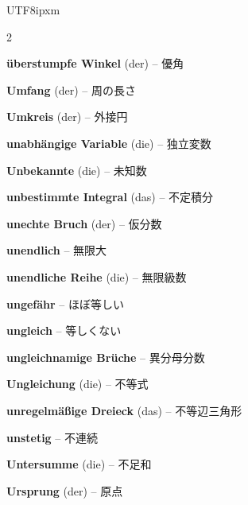 \begin{CJK}{UTF8}{ipxm}
\begin{multicols}{2}
\par\nopagebreak
\textbf{überstumpfe Winkel} (der) -- 優角\dotfill\hyperref[e:161]{\pageref*{e:161}}\par
\textbf{Umfang} (der) -- 周の長さ\dotfill\hyperref[e:209]{\pageref*{e:209}}\par
\textbf{Umkreis} (der) -- 外接円\dotfill\hyperref[e:194]{\pageref*{e:194}}\par
\textbf{unabhängige Variable} (die) -- 独立変数\dotfill\hyperref[e:106]{\pageref*{e:106}}\par
\textbf{Unbekannte} (die) -- 未知数\dotfill\hyperref[e:73]{\pageref*{e:73}}\par
\textbf{unbestimmte Integral} (das) -- 不定積分\dotfill\hyperref[e:287]{\pageref*{e:287}}\par
\textbf{unechte Bruch} (der) -- 仮分数\dotfill\hyperref[e:32]{\pageref*{e:32}}\par
\textbf{unendlich} -- 無限大\dotfill\hyperref[e:70]{\pageref*{e:70}}\par
\textbf{unendliche Reihe} (die) -- 無限級数\dotfill\hyperref[e:266]{\pageref*{e:266}}\par
\textbf{ungefähr} -- ほぼ等しい\dotfill\hyperref[e:69]{\pageref*{e:69}}\par
\textbf{ungleich} -- 等しくない\dotfill\hyperref[e:61]{\pageref*{e:61}}\par
\textbf{ungleichnamige Brüche} -- 異分母分数\dotfill\hyperref[e:35]{\pageref*{e:35}}\par
\textbf{Ungleichung} (die) -- 不等式\dotfill\hyperref[e:77]{\pageref*{e:77}}\par
\textbf{unregelmäßige Dreieck} (das) -- 不等辺三角形\dotfill\hyperref[e:180]{\pageref*{e:180}}\par
\textbf{unstetig} -- 不連続\dotfill\hyperref[e:269]{\pageref*{e:269}}\par
\textbf{Untersumme} (die) -- 不足和\dotfill\hyperref[e:294]{\pageref*{e:294}}\par
\textbf{Ursprung} (der) -- 原点\dotfill\hyperref[e:115]{\pageref*{e:115}}\par


\end{multicols}
\end{CJK}

